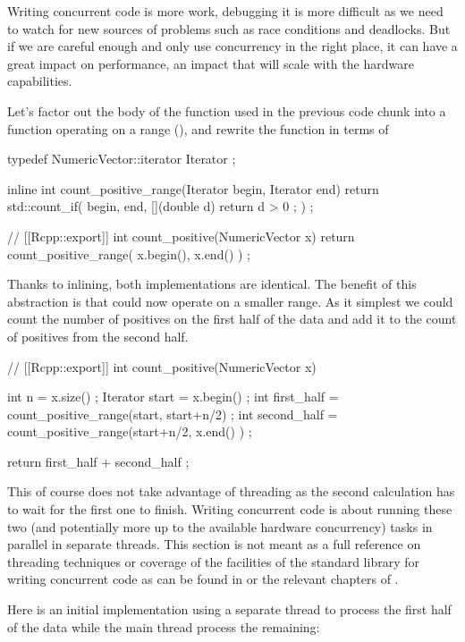 Writing concurrent code is more work, debugging it is more difficult as we need
to watch for new sources of problems such as race conditions and deadlocks. But 
if we are careful enough and only use concurrency in the right place, it can 
have a great impact on performance, an impact that will scale with the
hardware capabilities. 

Let's factor out the body of the function used in the previous code chunk
into a function operating on a range (), 
and rewrite the  function in terms of 

\begin{example}
typedef NumericVector::iterator Iterator ;

inline int count_positive_range(Iterator begin, Iterator end){
  return std::count_if( begin, end, 
    [](double d){ return d > 0 ;}
  ) ;
}

// [[Rcpp::export]]
int count_positive(NumericVector x){
  return count_positive_range( x.begin(), x.end() ) ;
}
\end{example}

Thanks to inlining, both implementations are identical. The benefit of 
this abstraction is that  could now 
operate on a smaller range. As it simplest we could count the 
number of positives on the first half of the data and add it to 
the count of positives from the second half. 

\begin{example}
// [[Rcpp::export]]
int count_positive(NumericVector x){
  int n = x.size() ;
  Iterator start  = x.begin() ;
  int first_half  = count_positive_range(start, start+n/2) ;
  int second_half = count_positive_range(start+n/2, x.end() ) ;
  
  return first_half + second_half ; 
}
\end{example}

This of course does not take advantage of threading as the second 
calculation has to wait for the first one to finish. Writing concurrent 
code is about running these two (and potentially more up to the available
hardware concurrency) tasks in parallel in separate threads. 
This section is not meant as a full reference on threading techniques
or coverage of the facilities of the standard library for writing 
concurrent code as can be found in \citep{williams2012} or the 
relevant chapters of \citep{Stroustrup2013}.

Here is an initial implementation using a separate thread to process
the first half of the data while the main thread process the remaining: 

